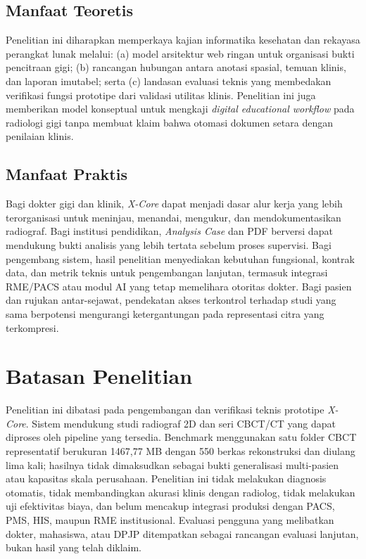 \documentclass[12pt,a4paper,oneside]{report}
\newcommand{\xcore}{\textit{X-Core}}
\begin{document}
\subsection{Manfaat Teoretis}

Penelitian ini diharapkan memperkaya kajian informatika kesehatan dan rekayasa perangkat lunak melalui: (a) model arsitektur web ringan untuk organisasi bukti pencitraan gigi; (b) rancangan hubungan antara anotasi spasial, temuan klinis, dan laporan imutabel; serta (c) landasan evaluasi teknis yang membedakan verifikasi fungsi prototipe dari validasi utilitas klinis. Penelitian ini juga memberikan model konseptual untuk mengkaji \textit{digital educational workflow} pada radiologi gigi tanpa membuat klaim bahwa otomasi dokumen setara dengan penilaian klinis.

\subsection{Manfaat Praktis}

Bagi dokter gigi dan klinik, \xcore{} dapat menjadi dasar alur kerja yang lebih terorganisasi untuk meninjau, menandai, mengukur, dan mendokumentasikan radiograf. Bagi institusi pendidikan, \textit{Analysis Case} dan PDF berversi dapat mendukung bukti analisis yang lebih tertata sebelum proses supervisi. Bagi pengembang sistem, hasil penelitian menyediakan kebutuhan fungsional, kontrak data, dan metrik teknis untuk pengembangan lanjutan, termasuk integrasi RME/PACS atau modul AI yang tetap memelihara otoritas dokter. Bagi pasien dan rujukan antar-sejawat, pendekatan akses terkontrol terhadap studi yang sama berpotensi mengurangi ketergantungan pada representasi citra yang terkompresi.

\section{Batasan Penelitian}

Penelitian ini dibatasi pada pengembangan dan verifikasi teknis prototipe \xcore{}. Sistem mendukung studi radiograf 2D dan seri CBCT/CT yang dapat diproses oleh pipeline yang tersedia. Benchmark menggunakan satu folder CBCT representatif berukuran 1467,77 MB dengan 550 berkas rekonstruksi dan diulang lima kali; hasilnya tidak dimaksudkan sebagai bukti generalisasi multi-pasien atau kapasitas skala perusahaan. Penelitian ini tidak melakukan diagnosis otomatis, tidak membandingkan akurasi klinis dengan radiolog, tidak melakukan uji efektivitas biaya, dan belum mencakup integrasi produksi dengan PACS, PMS, HIS, maupun RME institusional. Evaluasi pengguna yang melibatkan dokter, mahasiswa, atau DPJP ditempatkan sebagai rancangan evaluasi lanjutan, bukan hasil yang telah diklaim.
\end{document}
